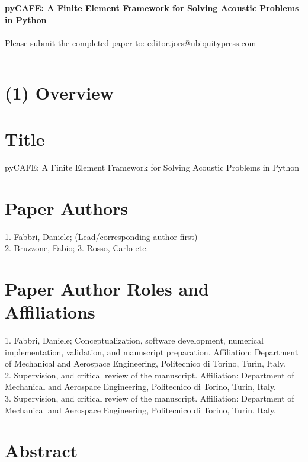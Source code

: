 \documentclass{jors}
\begin{document}
{\bf {pyCAFE: A Finite Element Framework for Solving Acoustic Problems in Python}} \\ \\

Please submit the completed paper to: editor.jors@ubiquitypress.com

\rule{\textwidth}{1pt}

\section*{(1) Overview}

\vspace{0.5cm}

\section*{Title}

pyCAFE: A Finite Element Framework for Solving Acoustic Problems in Python

\section*{Paper Authors}

1. Fabbri, Daniele; (Lead/corresponding author first) \\
2. Bruzzone, Fabio; 3. Rosso, Carlo etc.
\section*{Paper Author Roles and Affiliations}
1. Fabbri, Daniele; Conceptualization, software development, numerical implementation, validation, and manuscript preparation. Affiliation: Department of Mechanical and Aerospace Engineering, Politecnico di Torino, Turin, Italy.\\
2. Supervision, and critical review of the manuscript. Affiliation: Department of Mechanical and Aerospace Engineering, Politecnico di Torino, Turin, Italy.\\
3. Supervision, and critical review of the manuscript. Affiliation: Department of Mechanical and Aerospace Engineering, Politecnico di Torino, Turin, Italy.

\section*{Abstract}
\end{document}
